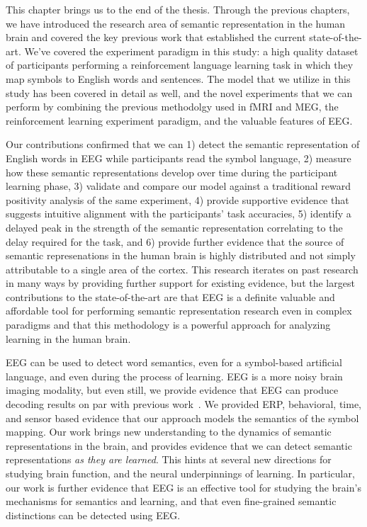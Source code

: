 \label{chapter:conclusion}

This chapter brings us to the end of the thesis. Through the previous chapters, 
we have introduced the research area of semantic representation in the human 
brain and covered the key previous work that established the current 
state-of-the-art. We've covered the experiment paradigm in this study: a high 
quality dataset of participants performing a reinforcement language learning 
task in which they map symbols to English words and sentences. The model that 
we utilize in this study has been covered in detail as well, and the novel 
experiments that we can perform by combining the previous methodolgy used in 
fMRI and MEG, the reinforcement learning experiment paradigm, and the valuable 
features of EEG.

Our contributions confirmed that we can 1) detect the semantic representation 
of English words in EEG while participants read the symbol language, 2) measure 
how these semantic representations develop over time during the participant 
learning phase, 3) validate and compare our model against a traditional reward 
positivity analysis of the same experiment, 4) provide supportive evidence that 
suggests intuitive alignment with the participants' task accuracies, 5) 
identify a delayed peak in the strength of the semantic representation 
correlating to the delay required for the task, and 6) provide further evidence 
that the source of semantic represenations in the human brain is highly 
distributed and not simply attributable to a single area of the cortex. This 
research iterates on past research in many ways by providing further support 
for existing evidence, but the largest contributions to the state-of-the-art 
are that EEG is a definite valuable and affordable tool for performing semantic 
representation research even in complex paradigms and that this methodology is 
a powerful approach for analyzing learning in the human brain.

EEG can be used to detect word semantics, even for a symbol-based artificial 
language, and even during the process of learning.  EEG is a more noisy brain 
imaging modality, but even still, we provide evidence that EEG can produce 
decoding results on par with previous work~\cite{Mitchell2008}. We provided 
ERP, behavioral, time, and sensor based evidence that our approach models the 
semantics of the symbol mapping. Our work brings new understanding to the 
dynamics of semantic representations in the brain, and provides evidence that 
we can detect semantic representations \emph{as they are learned}.  This hints 
at several new directions for studying brain function, and the neural 
underpinnings of learning.  In particular, our work is further evidence that 
EEG is an effective tool for studying the brain's mechanisms for semantics and 
learning, and that even fine-grained semantic distinctions can be detected 
using EEG.
